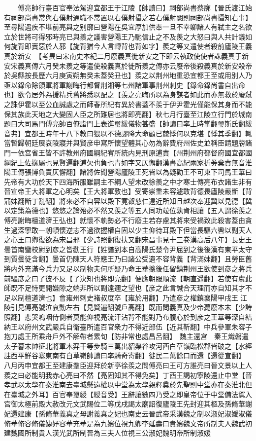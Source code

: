 　　傅亮帥行臺百官奉法駕迎宜都王于江陵【帥讀曰】祠部尚書蔡廓【晉氏渡江始有祠部尚書常與右僕射通職不常置以右僕射攝之若右僕射闕則祠部尚書攝知右事】至尋陽遇疾不堪前亮與之别廓曰營陽在吳宜厚加供奉一旦不幸卿諸人有弑主之名欲立於世將可得邪時亮已與羨之議害營陽王乃馳信止之不及羨之大怒曰與人共計議如何旋背即賣惡於人邪【旋背猶今人言轉背也背如字】羨之等又遣使者殺前廬陵王義真於新安　【考異曰宋南史本紀二月廢義真徙新安之下即云執政使使者誅義真于新安宋義真傳六月癸未羨之等遣使殺義真於徙所羨之傳亦云廢帝後殺義真於新安殺帝於吳縣按長歷六月庚寅朔無癸未蓋癸丑也】羨之以荆州地重恐宜都王至或用别人乃亟以錄命除領軍將軍謝晦行都督荆湘等七州諸軍事荆州刺史【錄命錄尚書自出命也】欲令居外為援精兵舊將悉以配之【羨之亮晦所以為身謀者如此而亦無救於廢弑之誅伊霍以至公血誠處之而師春所紀有異於書蓋不羨于伊尹霍光僅能保其身而不能保其族此天地之大變固人臣之所難居也將即亮翻】秋七月行臺至江陵立行門於城南題曰大司馬門傅亮帥百僚詣門上表進璽紱儀物甚盛【帥讀曰率上時掌翻璽斯氏翻紱音弗】宜都王時年十八下教曰猥以不德謬降大命顧已兢悸何以克堪【悸其季翻】輒當暫歸朝廷展哀陵寢并與賢彦申寫所懷望體其心勿為辭費府州佐史並稱臣請題牓諸門一依宫省王皆不許教州府國綱紀宥所統内見刑原逋責【州荆州府都督府國宜都國綱紀上佐掾屬也見賢遍翻逋欠也負也青如字又仄懈翻漢書高紀兩家折券棄責無音淮陽王傳張博負責仄懈翻】諸將佐聞營陽廬陵王死皆以為疑勸王不可東下司馬王華曰先帝有大功於天下四海所服雖嗣主不綱人望未改徐羨之中才寒士傳亮布衣諸生非有晉宣帝王大將軍之心明矣【王大將軍敦也】受寄崇重未容遽敢背德畏廬陵嚴斷【背蒲妹翻斷丁亂翻】將來必不自容以殿下寛叡慈仁遠近所知且越次奉迎冀以見德【冀以定策為德也】悠悠之論殆必不然又羨之等五人同功竝位孰肯相讓【五人謂徐羨之傅亮謝晦檀道濟王弘也】就懷不軌勢必不行廢主若存慮其將來受禍致此殺害蓋由貪生過深寧敢一朝頓懷逆志不過欲握權自固以少主仰待耳殿下但當長驅六轡以副天人之心王曰卿復欲為宋昌邪【少詩照翻復扶又翻宋昌事見十三卷漢高后八年】長史王曇首南蠻校尉到彦之皆勸王行【姓譜到本自高陽氏楚令尹屈到之後後漢有東平太守到質曇徒含翻】曇首仍陳天人符應王乃曰諸公受遺不容背義【背滿妹翻】且勞臣舊將内外充滿今兵力又足以制物夫何所疑乃命王華摠後任留鎮荆州王欲使到彦之將兵前驅彦之曰了彼不反【了決知也將即亮翻】便應朝服順流【朝直遥翻】若使有虞此師既不足恃更開嫌隙之端非所以副遠邇之望也【彦之此言誠合天理而亦自知其才不足以制檀道濟也】會雍州刺史褚叔度卒【雍於用翻】乃遣彦之權鎮襄陽甲戌王江陵引見傅亮號泣哀動左右【見賢遍翻號戶高翻】既而問義真及少帝薨廢本末【少詩照翻】悲哭嗚咽侍側者莫能仰視亮流汗沾背不能對乃布腹心於到彦之王華等深自結納王以府州文武嚴兵自衛臺所遣百官衆力不得近部伍【近其靳翻】中兵參軍朱容子抱刀處王所乘舟戶外不解帶者累旬【防非常也處昌呂翻】　魏主還宫　秦王熾磐遣太子暮末帥征北將軍木弈干等步騎三萬出貂渠谷攻河西白草嶺臨松郡皆破之【水經註西平鮮谷塞東南有白草嶺帥讀曰率騎奇寄翻】徙民二萬餘口而還【還從宣翻】　八月丙申宜都王至建康羣臣迎拜於新亭徐羨之問傅亮曰王可方誰亮曰晉文景以上人羨之曰必能明我赤心亮曰不然【亮固知其不得免矣】丁酉王謁初寧陵還止中堂【晉孝武以太學在秦淮南去臺城懸遠權以中堂為太學親釋奠於先聖則中堂亦在秦淮北但在臺城之外耳】百官奉璽綬【綬音受】王辭讓數四乃受之即皇帝位于中堂備法駕入宫御太極前殿大赦改元文武賜位二等戊戌謁太廟詔復廬陵王先封迎其柩及孫脩華謝妃還建康【孫脩華義真之母謝義真之妃也南史云晉武帝采漢魏之制以淑妃淑媛淑儀脩華脩容脩儀婕妤容華充華是為九嬪位視九卿李延夀曰貴嬪魏文帝所制夫人魏武初建魏國所制貴人漢光武所制晉為三夫人位視三公淑妃魏明帝所制淑媛